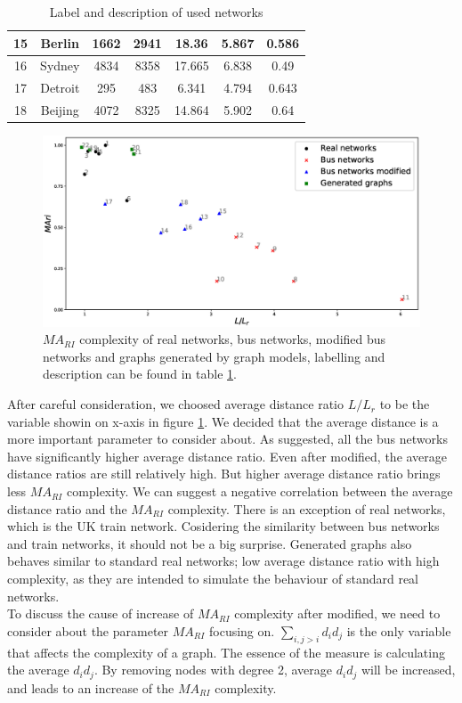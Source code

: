 \documentclass[12pt]{article}
\begin{document}
\begin{table}[ht]
{\begin{tabular}{|c|c|c|c|c|c|c|c|}
            \hline
            15&\multicolumn{2}{c|}{Berlin}&1662&2941&18.36&5.867&0.586\\ 
            \hline
            16&\multicolumn{2}{c|}{Sydney}&4834&8358&17.665&6.838&0.49\\ 
            \hline
            17&\multicolumn{2}{c|}{Detroit}&295&483&6.341&4.794&0.643\\ 
            \hline
            18&\multicolumn{2}{c|}{Beijing}&4072&8325&14.864&5.902&0.64\\ 
            \hline
        \end{tabular}
    }
    \caption{Label and description of used networks} 
    \label{tb:descriptions}
\end{table}


\begin{figure}[ht]
    \includegraphics[width = \textwidth]{real_networks.eps}
    \caption{$MA_{RI}$ complexity of real networks, bus networks, modified bus networks and graphs generated by graph models, labelling and description can be found in table \ref{tb:descriptions}.}
    \label{fig:real_networks}
\end{figure}
After careful consideration, we choosed average distance ratio $L/L_r$ to be the variable showin on x-axis in figure \ref{fig:real_networks}. We decided that the average distance is a more important parameter to consider about. As suggested, all the bus networks have significantly higher average distance ratio. Even after modified, the average distance ratios are still relatively high. But higher average distance ratio brings less $MA_{RI}$ complexity. We can suggest a negative correlation between the average distance ratio and the $MA_{RI}$ complexity. There is an exception of real networks, which is the UK train network. Cosidering the similarity between bus networks and train networks, it should not be a big surprise. Generated graphs also behaves similar to standard real networks; low average distance ratio with high complexity, as they are intended to simulate the behaviour of standard real networks.\\
To discuss the cause of increase of $MA_{RI}$ complexity after modified, we need to consider about the parameter $MA_{RI}$ focusing on. $\sum_{i,j>i}d_id_j$ is the only variable that affects the complexity of a graph. The essence of the measure is calculating the average $d_id_j$. By removing nodes with degree 2, average $d_id_j$ will be increased, and leads to an increase of the $MA_{RI}$ complexity.
\end{document}
